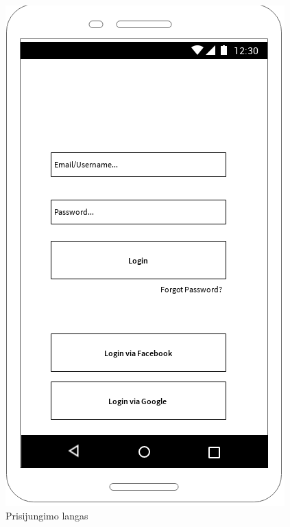 \documentclass{VUMIFPSkursinis}
\begin{document}
\begin{figure}[H]
	\centering
	\includegraphics[scale=0.9]{img/login_window}
	\caption{Prisijungimo langas}
	\label{img:login_window}
\end{figure}
\end{document}
